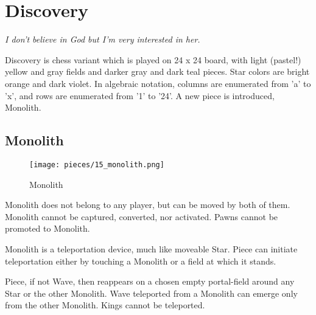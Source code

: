 

\chapter*{Discovery}

\begin{flushright}
\parbox{0.8\textwidth}{
\emph{I don’t believe in God but I’m very interested in her. \\
 } }
\end{flushright}

\noindent
Discovery is chess variant which is played on 24 x 24 board, with
light (pastel!) yellow and gray fields and darker gray and dark teal
pieces. Star colors are bright orange and dark violet. In algebraic
notation, columns are enumerated from 'a' to 'x', and rows are
enumerated from '1' to '24'. A new piece is introduced, Monolith.

\clearpage %

\section*{Monolith}

\vspace*{-1.1\baselineskip}
\noindent
\begin{wrapfigure}[11]{l}{0.4\textwidth}
\centering
\texttt{[image: pieces/15\_monolith.png]}
\caption{Monolith}
\label{fig:15_monolith}
\end{wrapfigure}
Monolith does not belong to any player, but can be moved by both of them.
Monolith cannot be captured, converted, nor activated.
Pawns cannot be promoted to Monolith.

Monolith is a teleportation device, much like moveable Star. Piece can
initiate teleportation either by touching a Monolith or a field at which
it stands.

Piece, if not Wave, then reappears on a chosen empty portal-field around
any Star or the other Monolith. Wave teleported from a Monolith can emerge
only from the other Monolith. Kings cannot be teleported.

